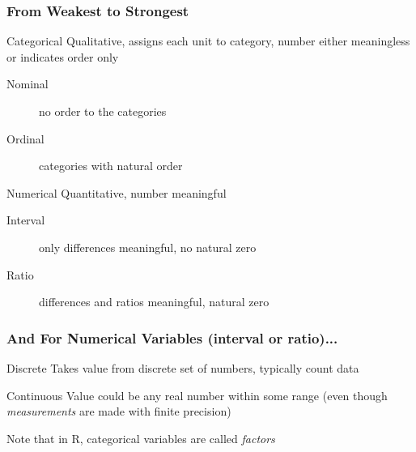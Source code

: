 \documentclass[handout]{beamer}
\begin{document}
\begin{frame}
\frametitle{From Weakest to Strongest}
\begin{block}{Categorical}
Qualitative, assigns each unit to category, number either meaningless or indicates order only \pause
		\begin{description}
			\item[Nominal] no order to the categories  \pause
			\item[Ordinal]  categories with natural order \pause
		\end{description}
\end{block}
\begin{block}{Numerical}
Quantitative, number meaningful \pause
		\begin{description}
			\item[Interval] only differences meaningful, no natural zero \pause
			\item[Ratio] differences and ratios meaningful, natural zero 
		\end{description}
\end{block}

\end{frame}


\begin{frame}
\frametitle{And For Numerical Variables (interval or ratio)...}
\begin{block}{Discrete}
Takes value from discrete set of numbers, typically count data
\end{block}
\pause
\begin{block}{Continuous}
Value could be any real number within some range (even though \emph{measurements} are made with finite precision)
\end{block}

\end{frame}

\begin{frame}
\begin{center}
\Huge
Note that in R, categorical variables are called \emph{factors}
\end{center}
\end{frame}
\end{document}
